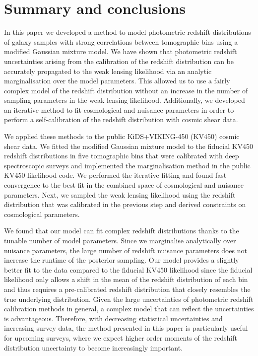 \documentclass{aa}
\begin{document}
\section{Summary and conclusions}
\label{sec:discussion}
In this paper we developed a method to model photometric redshift distributions of galaxy samples with strong correlations between tomographic bins using a modified Gaussian mixture model. We have shown that photometric redshift uncertainties arising from the calibration of the redshift distribution can be accurately propagated to the weak lensing likelihood via an analytic marginalisation over the model parameters.  This allowed us to use a fairly complex model of the redshift distribution without an increase in the number of sampling parameters in the weak lensing likelihood. Additionally, we developed an iterative method to fit cosmological and nuisance parameters in order to perform a self-calibration of the redshift distribution with cosmic shear data.

We applied these methods to the public KiDS+VIKING-450 (KV450) cosmic shear data. We fitted the modified Gaussian mixture model to the fiducial KV450 redshift distributions in five tomographic bins that were calibrated with deep spectroscopic surveys and implemented the marginalisation method in the public KV450 likelihood code. We performed the iterative fitting and found fast convergence to the best fit in the combined space of cosmological and nuisance parameters. Next, we sampled the weak lensing likelihood using the redshift distribution that was calibrated in the previous step and derived constraints on cosmological parameters.

We found that our model can fit complex redshift distributions thanks to the tunable number of model parameters. Since we marginalise analytically over nuisance parameters, the large number of redshift nuisance parameters does not increase the runtime of the posterior sampling. Our model provides a slightly better fit to the data compared to the fiducial KV450 likelihood since the fiducial likelihood only allows a shift in the mean of the redshift distribution of each bin and thus requires a pre-calibrated redshift distribution that closely resembles the true underlying distribution. Given the large uncertainties of photometric redshift calibration methods in general, a complex model that can reflect the uncertainties is advantageous. Therefore, with decreasing statistical uncertainties and increasing survey data, the method presented in this paper is particularly useful for upcoming surveys, where we expect higher order moments of the redshift distribution uncertainty to become increasingly important.
\end{document}
